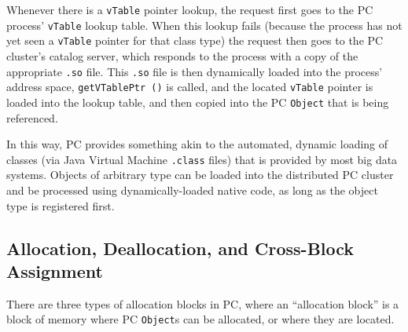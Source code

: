 Whenever there is a \texttt{vTable} pointer lookup, the request first goes to the PC process' \texttt{vTable} lookup table.  When this 
lookup fails (because the process has not yet seen a \texttt{vTable} pointer for that class
type) the request then goes to the PC cluster's catalog server, which responds to the process with a copy of the appropriate \texttt{.so} file.  This 
\texttt{.so} file is then 
dynamically loaded into the process' address space, \texttt{getVTablePtr ()} is called, 
and the located \texttt{vTable} pointer is loaded into the lookup table, and then copied into the PC \texttt{Object} that is being referenced.  

In this way, PC provides something akin to the automated,
dynamic loading of classes (via Java Virtual Machine \texttt{.class} files) that is
provided by most big data systems.  
Objects of arbitrary type can be loaded into the distributed PC cluster and be processed using dynamically-loaded native code, as long
as the object type is registered first.

\subsection{Allocation, Deallocation, and Cross-Block Assignment}

There are three types of allocation blocks in PC, where an ``allocation block'' is a block of memory where PC \texttt{Object}s can be
allocated, or where they are located.

